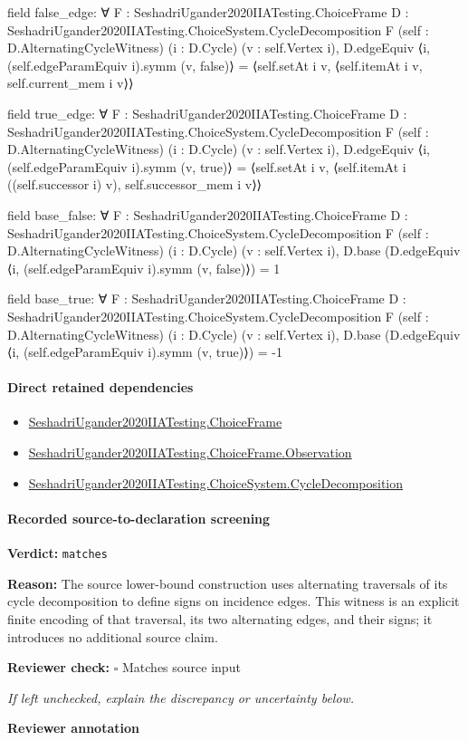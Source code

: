 \documentclass[10pt]{article}
\newcommand{\reviewerbox}{%
  \par\noindent\fbox{\parbox{0.96\linewidth}{\rule{0pt}{0.38in}}}\par
}
\newcommand{\reviewmatch}[1]{%
  \par\noindent\textbf{Reviewer check:} $\square$\; #1\par
  \noindent\emph{If left unchecked, explain the discrepancy or uncertainty below.}\par
}
\begin{document}
\begin{ReviewVerbatim}
field false_edge:
∀ {F : SeshadriUgander2020IIATesting.ChoiceFrame} {D : SeshadriUgander2020IIATesting.ChoiceSystem.CycleDecomposition F}
  (self : D.AlternatingCycleWitness) (i : D.Cycle) (v : self.Vertex i),
  D.edgeEquiv ⟨i, (self.edgeParamEquiv i).symm (v, false)⟩ = ⟨self.setAt i v, ⟨self.itemAt i v, self.current_mem i v⟩⟩

field true_edge:
∀ {F : SeshadriUgander2020IIATesting.ChoiceFrame} {D : SeshadriUgander2020IIATesting.ChoiceSystem.CycleDecomposition F}
  (self : D.AlternatingCycleWitness) (i : D.Cycle) (v : self.Vertex i),
  D.edgeEquiv ⟨i, (self.edgeParamEquiv i).symm (v, true)⟩ =
    ⟨self.setAt i v, ⟨self.itemAt i ((self.successor i) v), self.successor_mem i v⟩⟩

field base_false:
∀ {F : SeshadriUgander2020IIATesting.ChoiceFrame} {D : SeshadriUgander2020IIATesting.ChoiceSystem.CycleDecomposition F}
  (self : D.AlternatingCycleWitness) (i : D.Cycle) (v : self.Vertex i),
  D.base (D.edgeEquiv ⟨i, (self.edgeParamEquiv i).symm (v, false)⟩) = 1

field base_true:
∀ {F : SeshadriUgander2020IIATesting.ChoiceFrame} {D : SeshadriUgander2020IIATesting.ChoiceSystem.CycleDecomposition F}
  (self : D.AlternatingCycleWitness) (i : D.Cycle) (v : self.Vertex i),
  D.base (D.edgeEquiv ⟨i, (self.edgeParamEquiv i).symm (v, true)⟩) = -1
\end{ReviewVerbatim}

\paragraph{Direct retained dependencies}
\begin{itemize}\raggedright
\item \hyperlink{paper-prerequisite-0b24d39c6f4d1898}{Seshadri\allowbreak{}Ugander2020\allowbreak{}IIA\allowbreak{}Testing.\allowbreak{}Choice\allowbreak{}Frame}
\item \hyperlink{paper-prerequisite-d450557e9618e377}{Seshadri\allowbreak{}Ugander2020\allowbreak{}IIA\allowbreak{}Testing.\allowbreak{}Choice\allowbreak{}Frame.\allowbreak{}Observation}
\item \hyperlink{paper-prerequisite-7ec2ce004f72e29f}{Seshadri\allowbreak{}Ugander2020\allowbreak{}IIA\allowbreak{}Testing.\allowbreak{}Choice\allowbreak{}System.\allowbreak{}Cycle\allowbreak{}Decomposition}
\end{itemize}
\paragraph{Recorded source-to-declaration screening}
\textbf{Verdict:} \texttt{matches}
\\
{\raggedright
\textbf{Reason:} The source lower-\allowbreak{}bound construction uses alternating traversals of its cycle decomposition to define signs on incidence edges.\allowbreak{} This witness is an explicit finite encoding of that traversal, its two alternating edges, and their signs;\allowbreak{} it introduces no additional source claim.\allowbreak{}
\par}
\reviewmatch{Matches source input}
\noindent\textbf{Reviewer annotation}\par
\reviewerbox
\clearpage
\hypertarget{paper-prerequisite-4f9c0f894e80708f}{}
\end{document}
